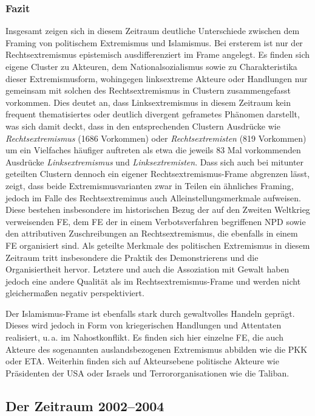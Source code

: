 \subsubsection{Fazit}\label{fazit}

Insgesamt zeigen sich in diesem Zeitraum deutliche Unterschiede zwischen dem Framing von politischem Extremismus und Islamismus. Bei ersterem ist nur der Rechtsextremismus epistemisch ausdifferenziert im Frame angelegt. Es finden sich eigene Cluster zu Akteuren, dem Nationalsozialismus sowie zu Charakteristika dieser Extremismusform, wohingegen linksextreme Akteure oder Handlungen nur gemeinsam mit solchen des Rechtsextremismus in Clustern zusammengefasst vorkommen. Dies deutet an, dass Linksextremismus in diesem Zeitraum kein frequent thematisiertes oder deutlich divergent geframetes Phänomen darstellt, was sich damit deckt, dass in den entsprechenden Clustern Ausdrücke wie \emph{Rechtsextremismus} (1686 Vorkommen) oder \emph{Rechtsextremisten} (819 Vorkommen) um ein Vielfaches häufiger auftreten als etwa die jeweils 83 Mal vorkommenden Ausdrücke \emph{Linksextremismus} und \emph{Linksextremisten}. Dass sich auch bei mitunter geteilten Clustern dennoch ein eigener Rechtsextremismus-Frame abgrenzen lässt, zeigt, dass beide Extremismusvarianten zwar in Teilen ein ähnliches Framing, jedoch im Falle des Rechtsextremimus auch Alleinstellungsmerkmale aufweisen. Diese bestehen insbesondere im historischen Bezug der auf den Zweiten Weltkrieg verweisenden FE, dem FE der in einem Verbotsverfahren begriffenen NPD sowie den attributiven Zuschreibungen an Rechtsextremismus, die ebenfalls in einem FE organisiert sind. Als geteilte Merkmale des politischen Extremismus in diesem Zeitraum tritt insbesondere die Praktik des Demonstrierens und die Organisiertheit hervor. Letztere und auch die Assoziation mit Gewalt haben jedoch eine andere Qualität als im Rechtsextremismus-Frame und werden nicht gleichermaßen negativ perspektiviert.

Der Islamismus-Frame ist ebenfalls stark durch gewaltvolles Handeln geprägt. Dieses wird jedoch in Form von kriegerischen Handlungen und Attentaten realisiert, u.\,a. im Nahostkonflikt. Es finden sich hier einzelne FE, die auch Akteure des sogenannten auslandsbezogenen Extremismus abbilden wie die PKK oder ETA. Weiterhin finden sich auf Akteursebene politische Akteure wie Präsidenten der USA oder Israels und Terrororganisationen wie die Taliban.

\subsection{Der Zeitraum 2002--2004}\label{der-zeitraum-2002-2004}

